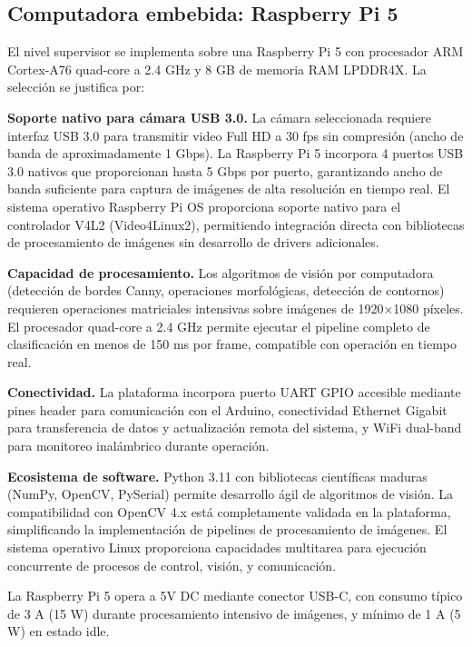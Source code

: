 \subsection{Computadora embebida: Raspberry Pi 5}

El nivel supervisor se implementa sobre una Raspberry Pi 5 con procesador ARM Cortex-A76 quad-core a 2.4 GHz y 8 GB de memoria RAM LPDDR4X. La selección se justifica por:

\textbf{Soporte nativo para cámara USB 3.0.} La cámara seleccionada requiere interfaz USB 3.0 para transmitir video Full HD a 30 fps sin compresión (ancho de banda de aproximadamente 1 Gbps). La Raspberry Pi 5 incorpora 4 puertos USB 3.0 nativos que proporcionan hasta 5 Gbps por puerto, garantizando ancho de banda suficiente para captura de imágenes de alta resolución en tiempo real. El sistema operativo Raspberry Pi OS proporciona soporte nativo para el controlador V4L2 (Video4Linux2), permitiendo integración directa con bibliotecas de procesamiento de imágenes sin desarrollo de drivers adicionales.

\textbf{Capacidad de procesamiento.} Los algoritmos de visión por computadora (detección de bordes Canny, operaciones morfológicas, detección de contornos) requieren operaciones matriciales intensivas sobre imágenes de 1920×1080 píxeles. El procesador quad-core a 2.4 GHz permite ejecutar el pipeline completo de clasificación en menos de 150 ms por frame, compatible con operación en tiempo real.

\textbf{Conectividad.} La plataforma incorpora puerto UART GPIO accesible mediante pines header para comunicación con el Arduino, conectividad Ethernet Gigabit para transferencia de datos y actualización remota del sistema, y WiFi dual-band para monitoreo inalámbrico durante operación.

\textbf{Ecosistema de software.} Python 3.11 con bibliotecas científicas maduras (NumPy, OpenCV, PySerial) permite desarrollo ágil de algoritmos de visión. La compatibilidad con OpenCV 4.x está completamente validada en la plataforma, simplificando la implementación de pipelines de procesamiento de imágenes. El sistema operativo Linux proporciona capacidades multitarea para ejecución concurrente de procesos de control, visión, y comunicación.

La Raspberry Pi 5 opera a 5V DC mediante conector USB-C, con consumo típico de 3 A (15 W) durante procesamiento intensivo de imágenes, y mínimo de 1 A (5 W) en estado idle.
